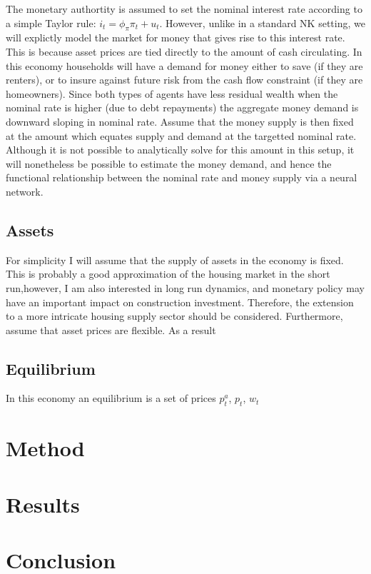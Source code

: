 \documentclass{article}
\begin{document}
The monetary authortity is assumed to set the nominal interest rate according to a simple Taylor rule: $i_t = \phi_\pi \pi_t + u_t$. However, unlike in a standard NK setting, we will explictly model the market for money that gives rise to this interest rate. This is because asset prices are tied directly to the amount of cash circulating. In this economy households will have a demand for money either to save (if they are renters), or to insure against future risk from the cash flow constraint (if they are homeowners). Since both types of agents have less residual wealth when the nominal rate is higher (due to debt repayments) the aggregate money demand is downward sloping in nominal rate. Assume that the money supply is then fixed at the amount which equates supply and demand at the targetted nominal rate. Although it is not possible to analytically solve for this amount in this setup, it will nonetheless be possible to estimate the money demand, and hence the functional relationship between the nominal rate and money supply via a neural network.

\subsection{Assets}

For simplicity I will assume that the supply of assets in the economy is fixed. This is probably a good approximation of the housing market in the short run,however, I am also interested in long run dynamics, and monetary policy may have an important impact on construction investment. Therefore, the extension to a more intricate housing supply sector should be considered. Furthermore, assume that asset prices are flexible. As a result  

\subsection{Equilibrium}

In this economy an equilibrium is a set of prices {$p^a_t$, $p_t$, $w_t$}

\section{Method} \label{method}

\section{Results} \label{results}

\section{Conclusion} \label{conclusion}


\newpage
\printbibliography
\end{document}
